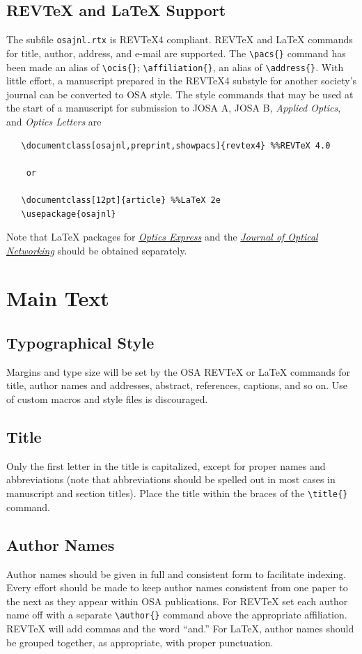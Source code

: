 \documentclass[letterpaper,12pt]{article}   %
\begin{document}
\subsection{REV\TeX{} and \LaTeX{} Support}
The subfile \texttt{osajnl.rtx} is REV\TeX{}4 compliant. REV\TeX{} and
\LaTeX{} commands for title, author, address, and e-mail are
supported. The \verb+\pacs{}+ command has been made an alias of
\verb+\ocis{}+; \verb+\affiliation{}+, an alias of
\verb+\address{}+. With little effort, a manuscript prepared in
the REV\TeX{}4 substyle for another society's journal can be
converted to OSA style. The style commands that may be used at the
start of a manuscript for submission to JOSA A, JOSA B,
\textit{Applied Optics}, and \textit{Optics Letters} are
\begin{verbatim}
   \documentclass[osajnl,preprint,showpacs]{revtex4} %%REVTeX 4.0
    
    or
   
   \documentclass[12pt]{article} %%LaTeX 2e
   \usepackage{osajnl}
\end{verbatim}

Note that \LaTeX{} packages for \href{http://www.opticsexpress.org}{\textit{Optics Express}} and the \href{http://www.osa-jon.org}{\textit{Journal of Optical Networking}} should be obtained separately.


\section{Main Text}
\subsection{Typographical Style}
Margins and type size will be set by the OSA REV\TeX{} or \LaTeX{}
commands for title, author names and addresses, abstract,
references, captions, and so on. Use of custom macros and style
files is discouraged.



\subsection{Title}
Only the first letter in the title is
capitalized, except for proper names and abbreviations (note that
abbreviations should be spelled out in most cases in manuscript
and section titles). Place the title within the braces of the
\verb+\title{}+ command.


\subsection{Author Names}
Author names should be given in full and consistent form to
facilitate indexing. Every effort should be made to keep author
names consistent from one paper to the next as they appear within
OSA publications.  For REV\TeX{} set each author name off with a
separate \verb+\author{}+ command above the appropriate
affiliation. REV\TeX{} will add commas and the word ``and.'' For
\LaTeX, author names should be grouped together, as appropriate,
with proper punctuation.
\end{document}
